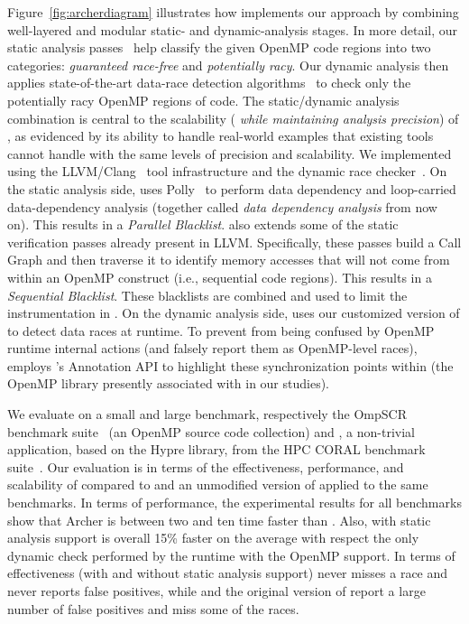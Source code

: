 \documentclass[svgnames,10pt]{article}
\begin{document}
Figure~\ref{fig:archerdiagram} illustrates how \archer implements our approach
by combining well-layered and modular static- and dynamic-analysis stages.
%
In more detail, our static analysis
passes~\cite{Kennedy:2001:OCM:502981,Muchnick:1998:ACD:286076,polly} help
classify the given OpenMP code regions into two categories: \emph{guaranteed
  race-free} and \emph{potentially racy}.
%
Our dynamic analysis then applies state-of-the-art data-race detection
algorithms~\cite{tsan:2009,Flanagan:2009} to check only the potentially racy
OpenMP regions of code.
%
The static/dynamic analysis combination is central to the scalability ({\em
  while maintaining analysis precision}) of \archer, as evidenced by its
ability to handle real-world examples that existing tools cannot handle with
the same levels of precision and scalability.
%
We implemented \archer using the
LLVM/Clang~\cite{lattner2004llvm} tool infrastructure and the
\tsan dynamic race checker~\cite{tsan}.
%
On the static analysis side, \archer uses Polly~\cite{polly} to perform data
dependency and loop-carried data-dependency analysis (together called {\em
  data dependency analysis} from now on).
%
This results in a {\em Parallel Blacklist}.
%
\archer also extends some of the static verification passes already present in
LLVM.
%
Specifically, these passes build a Call Graph and then traverse it to identify
memory accesses that will not come from within an OpenMP construct (i.e.,
sequential code regions).
%
This results in a {\em Sequential Blacklist}.
%
These blacklists are combined and used to limit the instrumentation in \tsan.
%
On the dynamic analysis side, \archer uses our customized version of \tsan to
detect data races at runtime.
%
To prevent \tsan from being confused by OpenMP runtime internal actions (and
falsely report them as OpenMP-level races), \archer employs \tsan's Annotation
API to highlight these synchronization points within \omp (the OpenMP library
presently associated with \archer in our studies).

We evaluate \archer on a small and large benchmark, respectively the OmpSCR
benchmark suite~\cite{ompscr} (an OpenMP source code collection) and
\amg, a non-trivial application, based on the Hypre library, from
the HPC CORAL benchmark suite~\cite{coral}.
%
Our evaluation is in terms of the effectiveness, performance, and scalability
of \archer compared to \insp and an unmodified version of \tsan applied to the
same benchmarks.
%
In terms of performance, the experimental results for all benchmarks show that
Archer is between two and ten time faster than \insp.
%
Also, \archer with static analysis support is overall 15\% faster on the
average with respect the only dynamic check performed by the \tsan runtime
with the OpenMP support.
%
In terms of effectiveness \archer (with and without static analysis support)
never misses a race and never reports false positives, while \insp and the
original version of \tsan report a large number of false positives and miss
some of the races.

\vspace{-10pt}
{\footnotesize
\newcommand{\BIBdecl}{\setlength{\itemsep}{0.25 em}}

}
\end{document}
